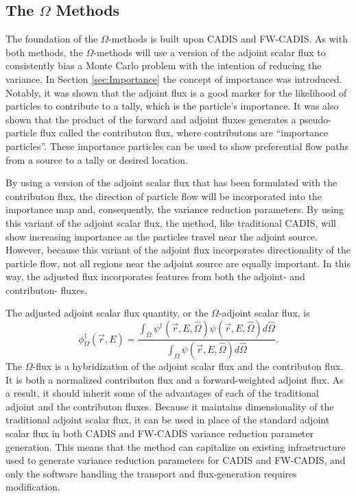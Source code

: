 \subsection{The $\Omega$ Methods}
\label{sec:omegaintro}

The foundation of the $\Omega$-methods is built upon CADIS and FW-CADIS. As with
both methods,
the $\Omega$-methods will use a version of the adjoint scalar flux to
consistently bias a Monte Carlo problem with the intention of reducing the
variance. In Section \ref{sec:Importance} the concept of importance was
introduced. Notably, it was shown that the adjoint flux is a good marker
for the likelihood of particles to contribute to a tally, which is the
particle's importance. It was also shown that the
product of the forward and adjoint fluxes generates a pseudo-particle flux called
the contributon flux, where contributons are ``importance particles''.
These importance particles can be used to show preferential flow paths from a
source to a tally or desired location.

By using a version of the adjoint scalar flux that has been formulated with the
contributon flux, the direction of particle flow will be incorporated into the
importance map and, consequently, the
variance reduction parameters. By using this variant of the adjoint scalar flux,
the method, like traditional CADIS, will show increasing importance as the
particles travel near the adjoint source. However, because this variant of the adjoint
flux incorporates directionality of the particle flow, not all regions near the
adjoint source are equally important. In this way, the adjusted flux
incorporates features from both the adjoint- and contributon- fluxes.

The adjusted adjoint scalar flux quantity, or the $\Omega$-adjoint
scalar flux, is
%
\begin{equation}
  \phi^{\dagger}_{\Omega}(\vec {r} ,E)  = \frac{\int_{\Omega}{\psi^{\dagger}
                             (\vec{r}, E, \hat\Omega)
                             \psi(\vec{r}, E, \hat\Omega)} d\hat{\Omega}}
                             {\int_{\Omega}\psi(\vec{r}, E, \hat\Omega)
                             d\hat{\Omega}}.
\label{eq:omega_basic}
\end{equation}
%
The $\Omega$-flux is a hybridization of the adjoint scalar flux and the contributon
flux. It is both a normalized contributon flux and a forward-weighted
adjoint flux. As a result, it should inherit some of the advantages of
each of the traditional
adjoint and the contributon fluxes. Because it maintains dimensionality of the
traditional adjoint scalar flux, it can be used in place of the standard adjoint
scalar flux in both
CADIS and FW-CADIS variance reduction parameter generation.
This means that the method can capitalize on existing infrastructure used to
generate variance reduction parameters for CADIS and FW-CADIS, and only the
software handling the transport and flux-generation requires modification.

